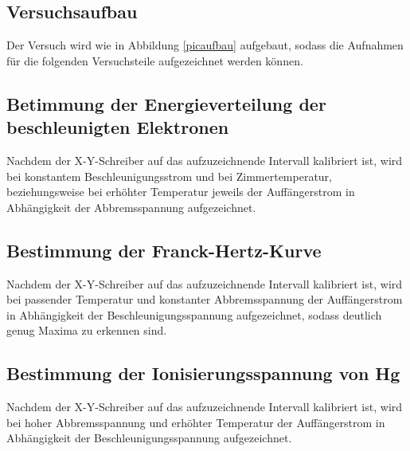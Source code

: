 %
\subsection{Versuchsaufbau}

Der Versuch wird wie in Abbildung \ref{picaufbau} aufgebaut, sodass
die Aufnahmen für die folgenden Versuchsteile aufgezeichnet werden können.
\subsection{Betimmung der Energieverteilung der beschleunigten Elektronen}
Nachdem der X-Y-Schreiber auf das aufzuzeichnende Intervall kalibriert ist, wird
bei konstantem Beschleunigungsstrom und
bei Zimmertemperatur, beziehungsweise bei erhöhter Temperatur
jeweils der Auffängerstrom in Abhängigkeit der Abbremsspannung aufgezeichnet.
\subsection{Bestimmung der Franck-Hertz-Kurve}
Nachdem der X-Y-Schreiber auf das aufzuzeichnende Intervall kalibriert ist, wird
bei passender Temperatur und konstanter Abbremsspannung der Auffängerstrom in 
Abhängigkeit der Beschleunigungsspannung 
aufgezeichnet, sodass deutlich genug Maxima zu erkennen sind.
\subsection{Bestimmung der Ionisierungsspannung von Hg}
Nachdem der X-Y-Schreiber auf das aufzuzeichnende Intervall kalibriert ist, wird
bei hoher Abbremsspannung und erhöhter Temperatur der Auffängerstrom in Abhängigkeit 
der Beschleunigungsspannung aufgezeichnet.